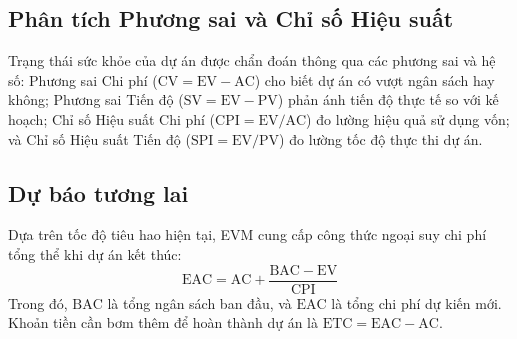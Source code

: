 \subsection{Phân tích Phương sai và Chỉ số Hiệu suất}
Trạng thái sức khỏe của dự án được chẩn đoán thông qua các phương sai và hệ số: Phương sai Chi phí ($\mathrm{CV} = \mathrm{EV} - \mathrm{AC}$) cho biết dự án có vượt ngân sách hay không; Phương sai Tiến độ ($\mathrm{SV} = \mathrm{EV} - \mathrm{PV}$) phản ánh tiến độ thực tế so với kế hoạch; Chỉ số Hiệu suất Chi phí ($\mathrm{CPI} = \mathrm{EV} / \mathrm{AC}$) đo lường hiệu quả sử dụng vốn; và Chỉ số Hiệu suất Tiến độ ($\mathrm{SPI} = \mathrm{EV} / \mathrm{PV}$) đo lường tốc độ thực thi dự án.

\subsection{Dự báo tương lai}
Dựa trên tốc độ tiêu hao hiện tại, EVM cung cấp công thức ngoại suy chi phí tổng thể khi dự án kết thúc:
\begin{equation}
    \mathrm{EAC} = \mathrm{AC} + \frac{\mathrm{BAC} - \mathrm{EV}}{\mathrm{CPI}}
\end{equation}
Trong đó, $\mathrm{BAC}$ là tổng ngân sách ban đầu, và $\mathrm{EAC}$ là tổng chi phí dự kiến mới. Khoản tiền cần bơm thêm để hoàn thành dự án là $\mathrm{ETC} = \mathrm{EAC} - \mathrm{AC}$.

